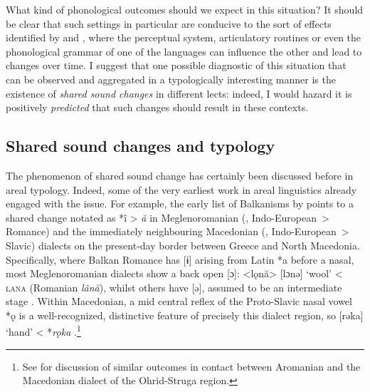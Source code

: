 \documentclass[output=paper,colorlinks,citecolor=brown]{langscibook}
\begin{document}
What kind of phonological outcomes should we expect in this situation? It should be clear that such settings in particular are conducive to the sort of effects identified by \textcite{blevins2017areal} and \textcite{Andersson2017}, where the perceptual system, articulatory routines or even the phonological grammar of one of the languages can influence the other and lead to changes over time. I suggest that one possible diagnostic of this situation that can be observed and aggregated in a typologically interesting manner is the existence of \emph{shared sound changes} in different lects: indeed, I would hazard it is positively \emph{predicted} that such changes should result in these contexts.

\subsection{Shared sound changes and typology}
\label{sec:shared-sound-changes}

The phenomenon of shared sound change has certainly been discussed before in areal typology. Indeed, some of the very earliest work in areal linguistics already engaged with the issue. For example, the early list of Balkanisms by \textcite{seliscev1925des} points to a shared change notated as *î > \textit{ă} in Meglenoromanian (, Indo-European~> Romance) and the immediately neighbouring Macedonian (, Indo-European~> Slavic) dialects on the present-day border between Greece and North Macedonia. Specifically, where Balkan Romance has [ɨ] arising from Latin *a before a nasal, most Meglenoromanian dialects show a back open [ɔ]: <lǫnă> [lɔnə] `wool' < \textsc{lana} (Romanian  \emph{lână}), whilst others have [ə], assumed to be an intermediate stage \parencite[ 97]{capidan1925meglenoromânii}. Within Macedonian, a mid central reflex of the Proto-Slavic nasal vowel *ǫ is a well-recognized, distinctive feature of precisely this dialect region, so [rəka] `hand' < *\emph{rǫka} \parencite[ 19–27]{vidoeski1999dijalektite}.\footnote{See \textcite[45–46]{marković2007aromanskiot} for discussion of similar outcomes in contact between Aromanian and the Macedonian dialect of the Ohrid-Struga region.}
\end{document}
